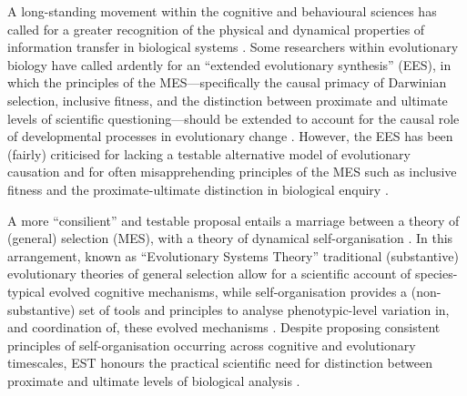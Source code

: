 \begin{CJK}{UTF8}{gbsn}
A long-standing movement within the cognitive and behavioural sciences has called for a greater recognition of the physical and dynamical properties of information transfer in biological systems  \citep{Kauffman1993,Kenrick2001,Hoelzer2006,Yufik2013}.  Some researchers within evolutionary biology have called ardently for an ``extended evolutionary synthesis'' (EES), in which the principles of the MES---specifically the causal primacy of Darwinian selection, inclusive fitness, and the distinction between proximate and ultimate levels of scientific questioning---should be extended to account for the causal role of developmental processes in evolutionary change \citep{Ingold2004,Odling-Smee2003,Pigliucci2007,Laland2011,Laland2013,Fuentes2016}. However, the EES has been (fairly) criticised for lacking a testable alternative model of evolutionary causation and for often  misapprehending principles of the MES such as inclusive fitness and the proximate-ultimate distinction in biological enquiry
\citep{Badcock2012,Abbot2011,Svensson2017,Dunbar1996,Scott-Phillips2011}.

A more ``consilient'' \citep{Wilson1999} and testable proposal entails a marriage between a theory of (general) selection (MES), with a theory of dynamical self-organisation  \citep{Kenrick2001,Hoelzer2006,Badcock2012}. In this arrangement, known as ``Evolutionary Systems Theory''  \citep[EST][]{Badcock2012,Badcock2017,Ramstead2017} traditional (substantive) evolutionary theories of general selection allow for a scientific account of species-typical evolved cognitive mechanisms, while self-organisation provides a (non-substantive) set of tools and principles to analyse phenotypic-level variation in, and coordination of, these evolved mechanisms \citep{Badcock2012}.  Despite proposing consistent principles of self-organisation occurring across cognitive and evolutionary timescales, EST honours the practical scientific need for distinction between proximate and ultimate levels of biological analysis \citep{Ramstead2017}.



\end{CJK}
